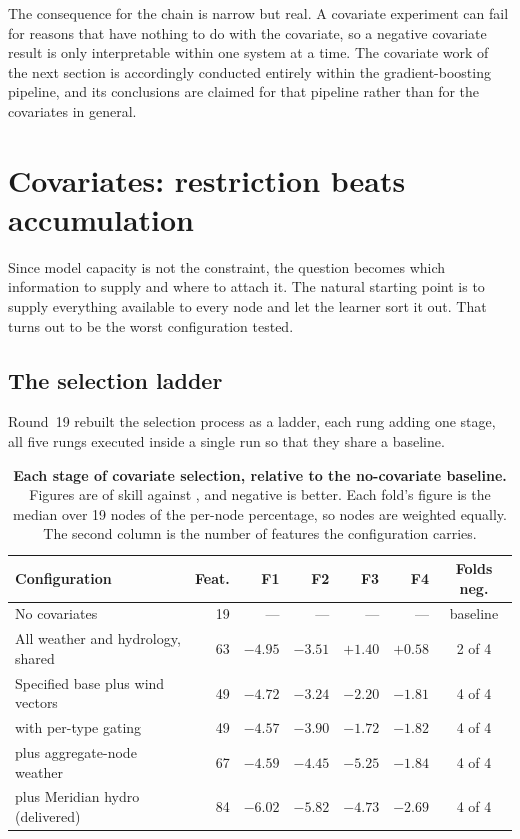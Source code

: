 The consequence for the chain is narrow but real. A covariate experiment can fail for
reasons that have nothing to do with the covariate, so a negative covariate result is only
interpretable within one system at a time. The covariate work of the next section is
accordingly conducted entirely within the gradient-boosting pipeline, and its conclusions
are claimed for that pipeline rather than for the covariates in general.

\section{Covariates: restriction beats accumulation}
\label{sec:res-cov}

Since model capacity is not the constraint, the question becomes which information to
supply and where to attach it. The natural starting point is to supply everything
available to every node and let the learner sort it out. That turns out to be the worst
configuration tested.

\subsection{The selection ladder}

Round~19 rebuilt the selection process as a ladder, each rung adding one stage, all five
rungs executed inside a single run so that they share a baseline.

\begin{table}[htp]
\centering
\begin{tabular}{lrrrrrc}
\toprule
{\bf Configuration} & {\bf Feat.} & {\bf F1} & {\bf F2} & {\bf F3} & {\bf F4} & {\bf Folds neg.} \\
\midrule
No covariates & 19 & --- & --- & --- & --- & baseline \\
All weather and hydrology, shared & 63 & $-4.95$ & $-3.51$ & $+1.40$ & $+0.58$ & 2 of 4 \\
Specified base plus wind vectors & 49 & $-4.72$ & $-3.24$ & $-2.20$ & $-1.81$ & 4 of 4 \\
\quad with per-type gating & 49 & $-4.57$ & $-3.90$ & $-1.72$ & $-1.82$ & 4 of 4 \\
\quad plus aggregate-node weather & 67 & $-4.59$ & $-4.45$ & $-5.25$ & $-1.84$ & 4 of 4 \\
\quad plus Meridian hydro (delivered) & 84 & $-6.02$ & $-5.82$ & $-4.73$ & $-2.69$ & 4 of 4 \\
\bottomrule
\end{tabular}
\caption[Selection ladder]{\textbf{Each stage of covariate selection, relative to the
no-covariate baseline.} Figures are \pp{} of skill against \naiveA{}, and negative is
better. Each fold's figure is the median over 19 nodes of the per-node percentage, so nodes
are weighted equally. The second column is the number of features the configuration
carries.}
\label{tab:ladder}
\end{table}


